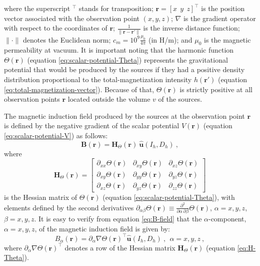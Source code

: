 where the superscript $^{\top}$ stands for transposition; 
$\mathbf{r} = \left[x \:\: y \:\: z \right]^{\top}$ is the position vector 
associated with the observation point $(x, y, z)$; 
$\nabla$ is the gradient operator with respect to the coordinates of $\mathbf{r}$;
$\tfrac{1}{\| \mathbf{r} - \mathbf{r}' \|}$ is the inverse distance function; 
$\| \cdot \|$ denotes the Euclidean norm; $c_{m} = 10^{9} \frac{\mu_{0}}{4\pi}$ (in H/m);
and $\mu_{0}$ is the magnetic permeability at vacuum. 
It is important noting that the harmonic function $\Theta(\mathbf{r})$ (equation
\ref{eq:scalar-potential-Theta}) represents the gravitational potential that would be
produced by the sources if they had a positive density distribution proportional
to the total-magnetization intensity $h(\mathbf{r}')$ 
(equation \ref{eq:total-magnetization-vector}). Because of that,
$\Theta(\mathbf{r})$ is strictly positive at all observation points 
$\mathbf{r}$ located outside the volume $v$ of the sources.

The magnetic induction field produced by the sources at the observation 
point $\mathbf{r}$ is defined by the negative gradient of the scalar potential
$V(\mathbf{r})$ (equation \ref{eq:scalar-potential-V}) as follows:
\begin{equation}
\mathbf{B}(\mathbf{r}) 
= \mathbf{H}_{\Theta}(\mathbf{r}) \: \hat{\mathbf{u}}(I_{h}, D_{h}) \: ,
\label{eq:B-field}
\end{equation}
where 
\begin{equation}
\mathbf{H}_{\Theta}(\mathbf{r}) = 
\begin{bmatrix}
\partial_{xx} \Theta(\mathbf{r}) & 
\partial_{xy} \Theta(\mathbf{r}) & 
\partial_{xz} \Theta(\mathbf{r}) \\
\partial_{xy} \Theta(\mathbf{r}) & 
\partial_{yy} \Theta(\mathbf{r}) & 
\partial_{yz} \Theta(\mathbf{r}) \\
\partial_{xz} \Theta(\mathbf{r}) & 
\partial_{yz} \Theta(\mathbf{r}) & 
\partial_{zz} \Theta(\mathbf{r})
\end{bmatrix}
\label{eq:H-Theta}
\end{equation}
is the Hessian matrix of $\Theta(\mathbf{r})$ (equation \ref{eq:scalar-potential-Theta}), 
with elements defined by the second derivatives 
$\partial_{\alpha\beta} \Theta(\mathbf{r}) \equiv 
\frac{\partial^{2}}{\partial\alpha \, \partial\beta} \Theta(\mathbf{r})$,
$\alpha = x, y, z$, $\beta = x, y, z$. 
It is easy to verify from equation \ref{eq:B-field} that the $\alpha$-component,
$\alpha = x, y, z$, of the magnetic induction field is given by:
\begin{equation}
B_{\alpha}(\mathbf{r}) 
= \partial_{\alpha} \nabla \Theta(\mathbf{r})^{\top} \hat{\mathbf{u}}(I_{h}, D_{h}) \: ,
\:\: \alpha = x, y, z \: ,
\label{eq:B-alpha}
\end{equation}
where $\partial_{\alpha} \nabla \Theta(\mathbf{r})^{\top}$ denotes a row of the
Hessian matrix $\mathbf{H}_{\Theta}(\mathbf{r})$ (equation \ref{eq:H-Theta}).


